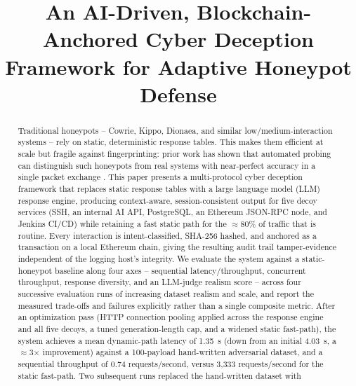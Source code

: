 \documentclass[conference]{IEEEtran}
\begin{document}
\title{An AI-Driven, Blockchain-Anchored Cyber Deception Framework for Adaptive Honeypot Defense}

\author{
}

\maketitle

\begin{abstract}
Traditional honeypots -- Cowrie, Kippo, Dionaea, and similar low/medium-interaction
systems -- rely on static, deterministic response tables. This makes them
efficient at scale but fragile against fingerprinting: prior work has shown
that automated probing can distinguish such honeypots from real systems with
near-perfect accuracy in a single packet exchange \cite{vetterl2018bitter}. This
paper presents a multi-protocol cyber deception framework that replaces static
response tables with a large language model (LLM) response engine, producing
context-aware, session-consistent output for five decoy services (SSH, an
internal AI API, PostgreSQL, an Ethereum JSON-RPC node, and Jenkins CI/CD)
while retaining a fast static path for the $\approx$80\% of traffic that is
routine. Every interaction is intent-classified, SHA-256 hashed, and anchored
as a transaction on a local Ethereum chain, giving the resulting audit trail
tamper-evidence independent of the logging host's integrity. We evaluate the
system against a static-honeypot baseline along four axes -- sequential
latency/throughput, concurrent throughput, response diversity, and an
LLM-judge realism score -- across four successive evaluation runs of
increasing dataset realism and scale, and report the measured trade-offs
and failures explicitly rather than a single composite metric. After an
optimization pass (HTTP connection pooling applied across the response
engine and all five decoys, a tuned generation-length cap, and a widened
static fast-path), the system achieves a mean dynamic-path latency of
1.35~s (down from an initial 4.03~s, a $\approx$3$\times$ improvement)
against a 100-payload hand-written adversarial dataset, and a sequential
throughput of 0.74 requests/second, versus 3{,}333 requests/second for the
static fast-path. Two subsequent runs replaced the hand-written dataset with

\end{abstract}
\end{document}

